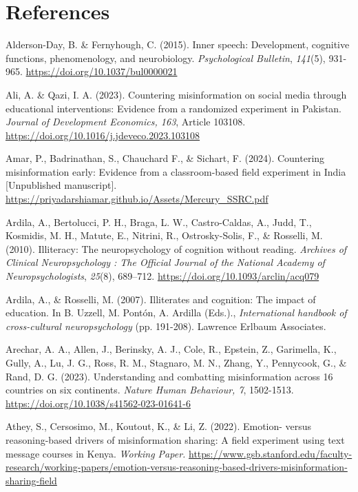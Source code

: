 \documentclass[authordate, reflection]{jote-new-article}
\begin{document}
	\section{References}



	Alderson-Day, B. \& Fernyhough, C. (2015). Inner speech: Development, cognitive functions, phenomenology, and neurobiology. \emph{Psychological Bulletin}, \emph{141}(5), 931-965. \url{https://doi.org/10.1037/bul0000021}



	Ali, A. \& Qazi, I. A. (2023). Countering misinformation on social media through educational interventions: Evidence from a randomized experiment in Pakistan. \emph{Journal of Development Economics, 163}, Article 103108. \url{https://doi.org/10.1016/j.jdeveco.2023.103108}



	Amar, P., Badrinathan, S., Chauchard F., \& Sichart, F. (2024). Countering misinformation early: Evidence from a classroom-based field experiment in India [Unpublished manuscript]. \url{https://priyadarshiamar.github.io/Assets/Mercury\_SSRC.pdf}



	Ardila, A., Bertolucci, P. H., Braga, L. W., Castro-Caldas, A., Judd, T., Kosmidis, M. H., Matute, E., Nitrini, R., Ostrosky-Solis, F., \& Rosselli, M. (2010). Illiteracy: The neuropsychology of cognition without reading. \emph{Archives of Clinical Neuropsychology : The Official Journal of the National Academy of Neuropsychologists}, \emph{25}(8), 689--712. \url{https://doi.org/10.1093/arclin/acq079}



	Ardila, A., \& Rosselli, M. (2007). Illiterates and cognition: The impact of education. In B. Uzzell, M. Pontón, A. Ardilla (Eds.)., \emph{International handbook of cross-cultural neuropsychology }(pp. 191-208). Lawrence Erlbaum Associates.



	Arechar, A. A., Allen, J., Berinsky, A. J., Cole, R., Epstein, Z., Garimella, K., Gully, A., Lu, J. G., Ross, R. M., Stagnaro, M. N., Zhang, Y., Pennycook, G., \& Rand, D. G. (2023). Understanding and combatting misinformation across 16 countries on six continents. \emph{Nature Human Behaviour, 7}, 1502-1513. \url{https://doi.org/10.1038/s41562-023-01641-6}



	Athey, S., Cersosimo, M., Koutout, K., \& Li, Z. (2022). Emotion- versus reasoning-based drivers of misinformation sharing: A field experiment using text message courses in Kenya. \emph{Working Paper.} \url{https://www.gsb.stanford.edu/faculty-research/working-papers/emotion-versus-reasoning-based-drivers-misinformation-sharing-field}
\end{document}
